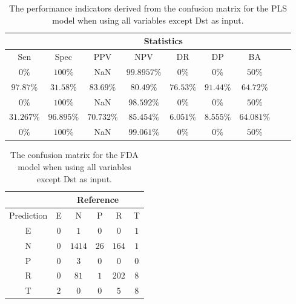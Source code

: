\begin{table}[!ht]
	\centering
	\begin{tabular}{|c|c|c|c|c|c|c|c|c|}
		\hline
		 & \multicolumn{7}{c|}{Statistics} \\ \hline
		Sen & Spec & PPV & NPV & DR & DP & BA \\ \hline
		$0\%$ & $100\%$ & NaN & $99.8957\%$ & $0\%$ & $0\%$ & $50\%$ \\ \hline
		$97.87\%$ & $31.58\%$ & $83.69\%$ & $80.49\%$ & $76.53\%$ & $91.44\%$ & $64.72\%$ \\ \hline
		$0\%$ & $100\%$ & NaN & $98.592\%$ & $0\%$ & $0\%$ & $50\%$ \\ \hline
		$31.267\%$ & $96.895\%$ & $70.732\%$ & $85.454\%$ & $6.051\%$ & $8.555\%$ & $64.081\%$ \\ \hline
		$0\%$ & $100\%$ & NaN & $99.061\%$ & $0\%$ & $0\%$ & $50\%$ \\ \hline
	\end{tabular}
	\caption{The performance indicators derived from the confusion matrix for the PLS model when using all variables except Dst as input.}
	\label{tab:cs:noDst:pls}
\end{table}

\begin{table}[!ht]
	\centering
	\begin{tabular}{|c|c|c|c|c|c|}
		\hline
		 & \multicolumn{5}{|c|}{Reference} \\ \hline
		 Prediction & E & N & P & R & T \\ \hline
		 E & $0$ & $1$ & $0$ & $0$ & $1$ \\ \hline
		 N & $0$ & $1414$ & $26$ & $164$ & $1$ \\ \hline
		 P & $0$ & $3$ & $0$ & $0$ & $0$ \\ \hline
		 R & $0$ & $81$ & $1$ & $202$ & $8$ \\ \hline
		 T & $2$ & $0$ & $0$ & $5$ & $8$ \\ \hline
	\end{tabular}
	\caption{The confusion matrix for the FDA model when using all variables except Dst as input.}
	\label{tab:cm:noDst:fda}
\end{table}

